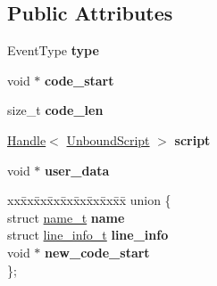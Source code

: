 \subsection*{Public Attributes}
\begin{DoxyCompactItemize}
\item 
\hypertarget{structv8_1_1_jit_code_event_ace1fbc4119ac3ef609d8e0f89cbc2c9f}{}Event\+Type {\bfseries type}\label{structv8_1_1_jit_code_event_ace1fbc4119ac3ef609d8e0f89cbc2c9f}

\item 
\hypertarget{structv8_1_1_jit_code_event_aeeac614e6c125bf08bf785b070090d0f}{}void $\ast$ {\bfseries code\+\_\+start}\label{structv8_1_1_jit_code_event_aeeac614e6c125bf08bf785b070090d0f}

\item 
\hypertarget{structv8_1_1_jit_code_event_ad56f78749d03f5db29ed417c2f3b4666}{}size\+\_\+t {\bfseries code\+\_\+len}\label{structv8_1_1_jit_code_event_ad56f78749d03f5db29ed417c2f3b4666}

\item 
\hypertarget{structv8_1_1_jit_code_event_a7c42ba82323ed1e91c5ef3f181c96d1e}{}\hyperlink{classv8_1_1_handle}{Handle}$<$ \hyperlink{classv8_1_1_unbound_script}{Unbound\+Script} $>$ {\bfseries script}\label{structv8_1_1_jit_code_event_a7c42ba82323ed1e91c5ef3f181c96d1e}

\item 
\hypertarget{structv8_1_1_jit_code_event_a90597e06440ebd68fe582bd1361d6de6}{}void $\ast$ {\bfseries user\+\_\+data}\label{structv8_1_1_jit_code_event_a90597e06440ebd68fe582bd1361d6de6}

\item 
\hypertarget{structv8_1_1_jit_code_event_af7964de4fa0dd0e4cf77749493ab606c}{}\begin{tabbing}
xx\=xx\=xx\=xx\=xx\=xx\=xx\=xx\=xx\=\kill
union \{\\
\>struct \hyperlink{structv8_1_1_jit_code_event_1_1name__t}{name\_t} {\bfseries name}\\
\>struct \hyperlink{structv8_1_1_jit_code_event_1_1line__info__t}{line\_info\_t} {\bfseries line\_info}\\
\>void $\ast$ {\bfseries new\_code\_start}\\
\}; \label{structv8_1_1_jit_code_event_af7964de4fa0dd0e4cf77749493ab606c}
\\

\end{tabbing}\end{DoxyCompactItemize}


